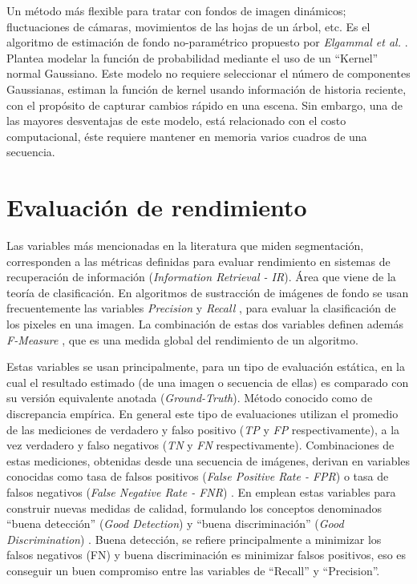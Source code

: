 \indent Un método más flexible para tratar con fondos de imagen dinámicos; fluctuaciones de cámaras, movimientos de las hojas de un árbol, etc. Es el algoritmo de estimación de fondo no-paramétrico propuesto por \textit{Elgammal et al.} \cite{elgammal_nonparametricmodel_2000}. Plantea modelar la función de probabilidad mediante el uso de un ``Kernel'' normal Gaussiano. Este modelo no requiere seleccionar el número de componentes Gaussianas, estiman la función de kernel usando información de historia reciente, con el propósito de capturar cambios rápido en una escena. Sin embargo, una de las mayores desventajas de este modelo, está relacionado con el costo computacional, éste requiere mantener en memoria varios cuadros de una secuencia.


\section{Evaluación de rendimiento}

\indent Las variables más mencionadas en la literatura que miden segmentación, corresponden a las métricas definidas para evaluar rendimiento en sistemas de recuperación de información (\textit{Information Retrieval - IR}). Área que viene de la teoría de clasificación. En algoritmos de sustracción de imágenes de fondo se usan frecuentemente las variables \textit{Precision} y \textit{Recall} \cite{prati_detecting_2003, benezeth_review_2008}, para evaluar la clasificación de los pixeles en una imagen. La combinación de estas dos variables definen además \textit{F-Measure} \cite{herrero_background_2009}, que es una medida global del rendimiento de un algoritmo.

\indent Estas variables se usan principalmente, para un tipo de evaluación estática, en la cual el resultado estimado (de una imagen o secuencia de ellas) es comparado con su versión equivalente anotada (\textit{Ground-Truth}). Método conocido como de discrepancia empírica. En general este tipo de evaluaciones utilizan el promedio de las mediciones de verdadero y falso positivo (\textit{TP} y \textit{FP} respectivamente), a la vez verdadero y falso negativos (\textit{TN} y \textit{FN} respectivamente). Combinaciones de estas mediciones, obtenidas desde una secuencia de imágenes, derivan en variables conocidas como tasa de falsos positivos (\textit{False Positive Rate - FPR}) o tasa de falsos negativos (\textit{False Negative Rate - FNR}) \cite{liu_metrics_2011}. En \cite{prati_detecting_2003} emplean estas variables para construir nuevas medidas de calidad, formulando los conceptos denominados ``buena detección'' (\textit{Good Detection}) y ``buena discriminación'' (\textit{Good Discrimination}) \cite{prati_detecting_2003}. Buena detección, se refiere principalmente a minimizar los falsos negativos (FN) y buena discriminación es minimizar falsos positivos, eso es conseguir un buen compromiso entre las variables de ``Recall'' y ``Precision''.

